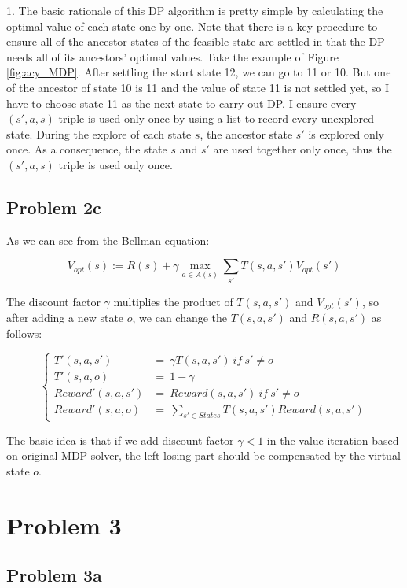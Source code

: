 \documentclass[paper=a4, fontsize=10pt]{scrartcl} %
\numberwithin{equation}{section} %
\numberwithin{figure}{section} %
\numberwithin{table}{section} %
\begin{document}
\begin{spacing}{1.}
The basic rationale of this DP algorithm is pretty simple by calculating the optimal value of each state one by one. Note that there is a key procedure to ensure all of the ancestor states of the feasible state are settled in that the DP needs all of its ancestors' optimal values. Take the example of Figure \ref{fig:acy_MDP}. After settling the start state 12, we can go to 11 or 10. But one of the ancestor of state 10 is 11 and the value of state 11 is not settled yet, so I have to choose state 11 as the next state to carry out DP. I ensure every $(s', a, s)$ triple is used only once by using a list to record every unexplored state. During the explore of each state $s$, the ancestor state $s'$ is explored only once. As a consequence, the state $s$ and $s'$ are used together only once, thus the $(s', a, s)$ triple is used only once.

\subsection{Problem 2c}
As we can see from the Bellman equation:

\begin{equation}
V_{opt}(s) := R(s) + \gamma \max \limits_{a \in A(s)} \sum_{s'} T(s, a, s')V_{opt}(s')
\end{equation}

The discount factor $\gamma$ multiplies the product of $T(s, a, s')$ and $V_{opt}(s')$, so after adding a new state $o$, we can change the $T(s, a, s')$ and $R(s, a, s')$ as follows:

\begin{displaymath}
\left\{
\begin{array}{rl}
T'(s, a, s')&= \ \gamma T(s, a, s') \ if \ s' \ne o\\
T'(s, a, o)&= \ 1 - \gamma\\
Reward'(s, a, s')&= \ Reward(s, a, s') \ if \ s' \ne o\\
Reward'(s, a, o)&= \ \sum_{s' \in States} T(s, a, s')Reward(s, a, s')
\end{array}
\right.
\end{displaymath}

The basic idea is that if we add discount factor $\gamma < 1$ in the value iteration based on original MDP solver, the left losing part should be compensated by the virtual state $o$.

\section{Problem 3}
\subsection{Problem 3a}






\end{spacing}
\end{document}
